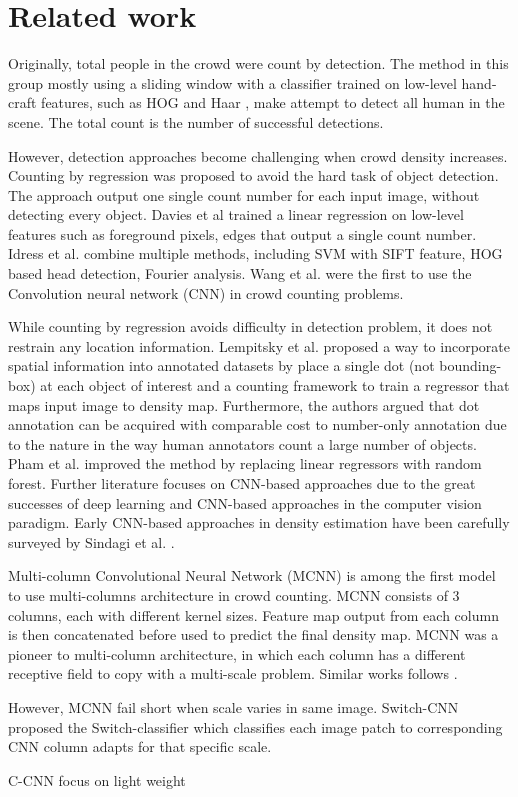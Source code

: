 \section{Related work}
Originally, total people in the crowd were count by detection. The method in this group mostly using a sliding window with a classifier trained on low-level hand-craft features, such as HOG \cite{dalal2005histograms} and Haar \cite{lin2001estimation}, make attempt to detect all human in the scene. The total count is the number of successful detections.

However, detection approaches become challenging when crowd density increases. Counting by regression was proposed to avoid the hard task of object detection. The approach output one single count number for each input image, without detecting every object. Davies et al \cite{davies1995crowd} trained a linear regression on low-level features such as foreground pixels, edges that output a single count number. Idress et al. \cite{idrees2013multi} combine multiple methods, including SVM with SIFT feature, HOG based head detection, Fourier analysis. Wang et al. \cite{wang2015deep} were the first to use the Convolution neural network (CNN) in crowd counting problems.

While counting by regression avoids difficulty in detection problem, it does not restrain any location information. Lempitsky et al. \cite{lempitsky2010learning} proposed a way to incorporate spatial information into annotated datasets by place a single dot (not bounding-box) at each object of interest and a counting framework to train a regressor that maps input image to density map. Furthermore, the authors argued that dot annotation can be acquired with comparable cost to number-only annotation due to the nature in the way human annotators count a large number of objects. Pham et al. \cite{7410729} improved the method by replacing linear regressors with random forest. Further literature focuses on CNN-based approaches due to the great successes of deep learning and CNN-based approaches in the computer vision paradigm. Early CNN-based approaches in density estimation have been carefully surveyed by Sindagi et al. \cite{SINDAGI20183}.


Multi-column Convolutional Neural Network (MCNN) \cite{zhang2016single} is among the first model to use multi-columns architecture in crowd counting. MCNN consists of 3 columns, each with different kernel sizes. Feature map output from each column is then concatenated before used to predict the final density map. MCNN was a pioneer to multi-column architecture, in which each column has a different receptive field to copy with a multi-scale problem. Similar works follows \cite{zhang2019crowd, 9053780}. 

However, MCNN fail short when scale varies in same image. Switch-CNN proposed the Switch-classifier which classifies each image patch to corresponding CNN column adapts for that specific scale. 




C-CNN \cite{9053780} focus on light weight 